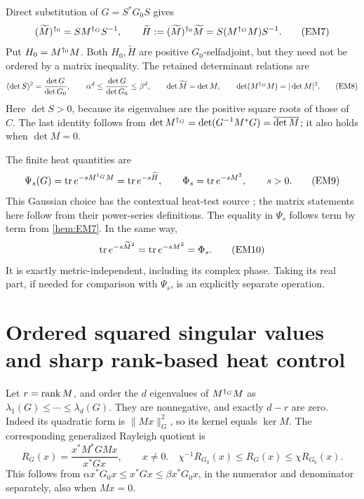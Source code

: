 \documentclass[11pt]{article}
\begin{document}
Direct substitution of \(G=S^*G_0S\) gives
\begin{equation}
 (\widetilde M)^{\dagger_0}=S M^{\dagger_G}S^{-1},\qquad
 \widetilde H:=(\widetilde M)^{\dagger_0}\widetilde M
     =S(M^{\dagger_G}M)S^{-1}.
 \tag{EM7}\label{hem:EM7}
\end{equation}
Put \(H_0=M^{\dagger_0}M\). Both \(H_0,\widetilde H\) are positive
\(G_0\)-selfadjoint, but they need not be ordered by a matrix inequality.
The retained determinant relations are
\begin{equation}
 (\det S)^2=\frac{\det G}{\det G_0},\qquad
 \alpha^d\le\frac{\det G}{\det G_0}\le\beta^d,\qquad
 \det\widetilde M=\det M,\qquad
 \det(M^{\dagger_G}M)=|\det M|^2.
 \tag{EM8}\label{hem:EM8}
\end{equation}
Here \(\det S>0\), because its eigenvalues are the positive square roots
of those of \(C\). The last identity follows from
\(\det M^{\dagger_G}=\det(G^{-1}M^*G)=\overline{\det M}\);
it also holds when \(\det M=0\).

The finite heat quantities are
\begin{equation}
 \Psi_s(G)=\operatorname{tr} e^{-sM^{\dagger_G}M}
          =\operatorname{tr} e^{-s\widetilde H},\qquad
 \Phi_s=\operatorname{tr} e^{-sM^2},\qquad s>0.
 \tag{EM9}\label{hem:EM9}
\end{equation}
This Gaussian choice has the contextual heat-test source
\cite[original-source formula \texttt{ft}]{hem:ConnesHeat}; the matrix
statements here follow from their power-series definitions.
The equality in \(\Psi_s\) follows term by term from \eqref{hem:EM7}.
In the same way,
\begin{equation}
 \operatorname{tr} e^{-s\widetilde M^2}=\operatorname{tr} e^{-sM^2}=\Phi_s.
 \tag{EM10}\label{hem:EM10}
\end{equation}
It is exactly metric-independent, including its complex phase. Taking its
real part, if needed for comparison with \(\Psi_s\), is an explicitly
separate operation.

\section{Ordered squared singular values and sharp rank-based heat control}

Let \(r=\operatorname{rank} M\), and order the \(d\) eigenvalues of \(M^{\dagger_G}M\) as
\(\lambda_1(G)\le\cdots\le\lambda_d(G)\). They are nonnegative, and
exactly \(d-r\) are zero. Indeed its quadratic form is
\(\|Mx\|_G^2\), so its kernel equals \(\ker M\).
The corresponding generalized Rayleigh quotient is
\begin{equation}
 R_G(x)=\frac{x^*M^*GMx}{x^*Gx},\qquad x\ne0.
 \quad
 \chi^{-1}R_{G_0}(x)\le R_G(x)\le\chi R_{G_0}(x).
 \tag{EM11}\label{hem:EM11}
\end{equation}
This follows from
\(\alpha x^*G_0x\le x^*Gx\le\beta x^*G_0x\), in the numerator and
denominator separately, also when \(Mx=0\).
\end{document}
